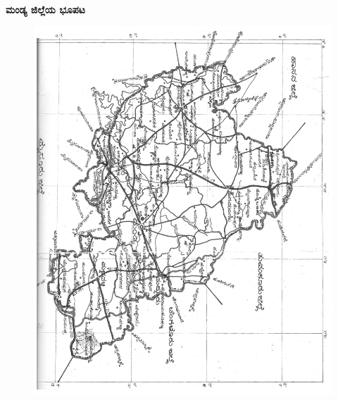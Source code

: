 ~\phantom{a}

\vfill

\thispagestyle{empty}

\centerline{\large\bf ಮಂಡ್ಯ ಜಿಲ್ಲೆಯ ಭೂಪಟ}

\begin{figure}[H]
\centering
\includegraphics[scale=1.05]{images/Mandya.jpg}
\end{figure}

\vfill
